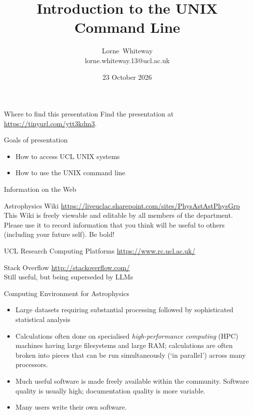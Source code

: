 \documentclass[dvipsnames]{beamer}
\title{Introduction to the UNIX Command Line}
\author{Lorne~Whiteway \\ lorne.whiteway.13@ucl.ac.uk}
\institute{Astrophysics Group\\  Department of Physics and Astronomy\\  University College London}
\date{23 October 2026}
\begin{document}
\frame{\titlepage}

\begin{frame}{Where to find this presentation}
    Find the presentation at \alert{\url{https://tinyurl.com/ytt3kdm3}}.\\
\end{frame}


\begin{frame}{Goals of presentation}
  \begin{itemize}
    \item How to access UCL UNIX systems
    \item How to use the UNIX command line
  \end{itemize}
\end{frame}


\begin{frame}{Information on the Web}
  \begin{block}{Astrophysics Wiki}
    {\small{\url{https://liveuclac.sharepoint.com/sites/PhysAstAstPhysGrp}}}
    This Wiki is freely viewable and editable by all members of the department. Please use it to record information that you think will be useful to others (including your future self). Be bold!
  \end{block}
  \begin{block}{UCL Research Computing Platforms}
    \url{https://www.rc.ucl.ac.uk/}
  \end{block}
  \begin{block}{Stack Overflow}
    \url{http://stackoverflow.com/}  \\ Still useful, but being superseded by LLMs
  \end{block}
\end{frame}


\begin{frame}{Computing Environment for Astrophysics}
  \begin{itemize}
  \item Large datasets requiring substantial processing followed by sophisticated statistical analysis
  \item Calculations often done on specialised \textit{high-performance computing} (HPC) machines having large filesystems and large RAM; calculations are often broken into pieces that can be run simultaneously (`in parallel') across many processors.
  \item Much useful software is made freely available within the community. Software quality is usually high; documentation quality is more variable.
  \item Many users write their own software.
  \end{itemize}
\end{frame}
\end{document}
